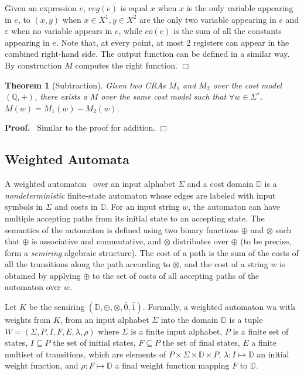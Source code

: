 \documentclass[11pt]{article}
\newtheorem{theorem}{Theorem}
\def\Proof{{\bf Proof.}}
\def\qed{{\bf $\Box$}}
\newcommand{\mypar}[1]{\subsection{#1}}
\def\qed{{\bf $\Box$}}
\newcommand{\st}{\ensuremath{^*}}
\newcommand{\domain}{\ensuremath{\mathbb{D}}}
\newcommand{\Rat}{\ensuremath{\mathbb{Q}}}
\newcommand{\inputalph}{\ensuremath{\Sigma}}
\newcommand{\edwa}{\ensuremath{M}}
\newcommand{\edwavariables}{\ensuremath{X}}
\newcommand{\WA}{{\sc\textsc wa}\xspace}
\newcommand{\srset}{\ensuremath{\domain}}
\newcommand{\srzero}{\ensuremath{\bar{0}}}
\newcommand{\srone}{\ensuremath{\bar{1}}}
\newcommand{\wa}{\ensuremath{W}}
\newcommand{\wastates}{\ensuremath{P}}
\newcommand{\wainitst}{\ensuremath{I}}
\newcommand{\wafinalst}{\ensuremath{F}}
\newcommand{\watrans}{\ensuremath{E}}
\newcommand{\wainit}{\ensuremath{\lambda}}
\newcommand{\wafinal}{\ensuremath{\rho}}
\newcommand{\jyo}[1]{}
\def\myplus{\otimes}
\def\mytimes{\oplus}
\begin{document}
Given an expression $e$, $reg(e)$ is equal $x$
when $x$ is the only variable appearing in $e$, to $(x,y)$ when
$x\in\edwavariables^1,y\in\edwavariables^2$ are the only two variable
appearing in $e$ and $\varepsilon$ when no variable appears in $e$,
while $co(e)$ is the sum of all the constants appearing in $e$.  Note
that, at every point, at most 2 registers can appear in the combined
right-hand side.  The output function can be defined in a similar way.
\jyo{We need a little more explanation here.} By construction $\edwa$
computes the right function.
\qed

\begin{theorem}[Subtraction]\label{subtraction}
Given two CRAs $\edwa_1$ and $\edwa_2$ over the cost model $(\Rat,+)$,
there exists a $\edwa$ over the same cost model such that
$\forall w\in\Sigma\st.$ $M(w)=M_1(w)-M_2(w)$.
\end{theorem}
\Proof~ Similar to the proof for addition.
\qed \\


\mypar{Weighted Automata}\label{wa}
A weighted automaton~\cite{droste_handbook_2009} over an input
alphabet $\Sigma$ and a cost domain $\domain$ is a {\em
nondeterministic\/} finite-state automaton whose edges are labeled
with input symbols in $\Sigma$ and costs in $\domain$.  For an input
string $w$, the automaton can have multiple accepting paths from its
initial state to an accepting state.  The semantics of the automaton
is defined using two binary functions $\mytimes$ and $\myplus$ such
that $\mytimes$ is associative and commutative, and $\myplus$
distributes over $\mytimes$ (to be precise, form a {\em semiring\/}
algebraic structure).  The cost of a path is the sum of the costs of
all the transitions along the path according to $\myplus$, and the
cost of a string $w$ is obtained by applying $\mytimes$ to the set of
costs of all accepting paths of the automaton over $w$.


Let $K$ be the semiring $(\srset,\mytimes,\myplus,\srzero, \srone)$.
Formally, a weighted automaton \WA with weights from $K$, from an
input alphabet $\Sigma$ into the domain $\srset$ is a tuple $\wa =
(\inputalph, \wastates, \wainitst, \wafinalst, \watrans, \wainit,
\wafinal)$ where $\Sigma$ is a finite input alphabet, $\wastates$ is a
finite set of states, $\wainitst\subseteq\wastates$ the set of initial
states, $\wafinalst\subseteq\wastates$ the set of final states,
$\watrans$  a finite multiset of transitions, which are elements of
$\wastates\times \Sigma \times \srset\times \wastates$, $\wainit :
\wainitst \mapsto \srset$ an initial weight function, and $\wafinal :
\wafinalst \mapsto \srset$ a final weight function mapping
$\wafinalst$ to $\srset$.
\end{document}
